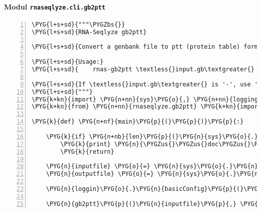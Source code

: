 \paragraph{Modul \texttt{rnaseqlyze.cli.gb2ptt}}
\label{rnaseqlyze-pdf:modul-rnaseqlyze-cli-gb2ptt}
\begin{Verbatim}[commandchars=\\\{\},numbers=left,firstnumber=1,stepnumber=5]
\PYG{l+s+sd}{"""\PYGZbs{}}
\PYG{l+s+sd}{RNA-Seqlyze gb2ptt}

\PYG{l+s+sd}{Convert a genbank file to ptt (protein table) format}

\PYG{l+s+sd}{Usage:}
\PYG{l+s+sd}{    rnas-gb2ptt \textless{}input.gb\textgreater{} \textless{}output.ptt\textgreater{}}

\PYG{l+s+sd}{If \textless{}input.gb\textgreater{} is '-', use 'sys.stdin, if \textless{}output.ptt\textgreater{} is '-', use 'sys.stdout'.}
\PYG{l+s+sd}{"""}
\PYG{k+kn}{import} \PYG{n+nn}{sys}\PYG{o}{,} \PYG{n+nn}{logging}
\PYG{k+kn}{from} \PYG{n+nn}{rnaseqlyze.gb2ptt} \PYG{k+kn}{import} \PYG{n}{gb2ptt}

\PYG{k}{def} \PYG{n+nf}{main}\PYG{p}{(}\PYG{p}{)}\PYG{p}{:}

    \PYG{k}{if} \PYG{n+nb}{len}\PYG{p}{(}\PYG{n}{sys}\PYG{o}{.}\PYG{n}{argv}\PYG{p}{)} \PYG{o}{\textless{}} \PYG{l+m+mi}{2} \PYG{o+ow}{or} \PYG{n}{sys}\PYG{o}{.}\PYG{n}{argv}\PYG{p}{[}\PYG{l+m+mi}{1}\PYG{p}{]} \PYG{o+ow}{in} \PYG{p}{(}\PYG{l+s}{'}\PYG{l+s}{-h}\PYG{l+s}{'}\PYG{p}{,} \PYG{l+s}{'}\PYG{l+s}{--help}\PYG{l+s}{'}\PYG{p}{)}\PYG{p}{:}
        \PYG{k}{print} \PYG{n}{\PYGZus{}\PYGZus{}doc\PYGZus{}\PYGZus{}}
        \PYG{k}{return}

    \PYG{n}{inputfile} \PYG{o}{=} \PYG{n}{sys}\PYG{o}{.}\PYG{n}{argv}\PYG{p}{[}\PYG{l+m+mi}{1}\PYG{p}{]} \PYG{o}{==} \PYG{l+s}{'}\PYG{l+s}{-}\PYG{l+s}{'} \PYG{o+ow}{and} \PYG{n}{sys}\PYG{o}{.}\PYG{n}{stdin} \PYG{o+ow}{or} \PYG{n+nb}{open}\PYG{p}{(}\PYG{n}{sys}\PYG{o}{.}\PYG{n}{argv}\PYG{p}{[}\PYG{l+m+mi}{1}\PYG{p}{]}\PYG{p}{)}
    \PYG{n}{outputfile} \PYG{o}{=} \PYG{n}{sys}\PYG{o}{.}\PYG{n}{argv}\PYG{p}{[}\PYG{l+m+mi}{2}\PYG{p}{]} \PYG{o}{==} \PYG{l+s}{'}\PYG{l+s}{-}\PYG{l+s}{'} \PYG{o+ow}{and} \PYG{n}{sys}\PYG{o}{.}\PYG{n}{stdout} \PYG{o+ow}{or} \PYG{n+nb}{open}\PYG{p}{(}\PYG{n}{sys}\PYG{o}{.}\PYG{n}{argv}\PYG{p}{[}\PYG{l+m+mi}{2}\PYG{p}{]}\PYG{p}{,} \PYG{l+s}{"}\PYG{l+s}{w}\PYG{l+s}{"}\PYG{p}{)}

    \PYG{n}{loggin}\PYG{o}{.}\PYG{n}{basicConfig}\PYG{p}{(}\PYG{n}{level}\PYG{o}{=}\PYG{n}{logging}\PYG{o}{.}\PYG{n}{NOTSET}\PYG{p}{)} \PYG{c}{\PYGZsh{} logs to stderr}

    \PYG{n}{gb2ptt}\PYG{p}{(}\PYG{n}{inputfile}\PYG{p}{,} \PYG{n}{outputfile}\PYG{p}{)}
\end{Verbatim}


